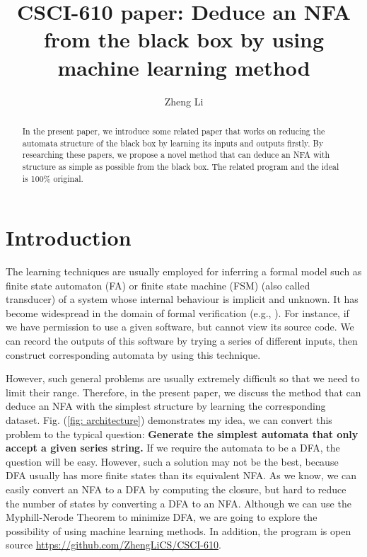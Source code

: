 \documentclass{article}
\begin{document}
\title{CSCI-610 paper: Deduce an NFA from the black box by using machine learning method}

\author{Zheng Li}
\maketitle


\begin{abstract}
    In the present paper, we introduce some related paper that works on reducing the automata structure of the black box by learning its inputs and outputs firstly. 
    By researching these papers,  we propose a novel method that can deduce an NFA with structure as simple as possible from the black box. The related program and the ideal is 100\% original. 
\end{abstract}

\section{Introduction}
The learning techniques are usually employed for inferring a formal model such as finite state automaton (FA) or finite state machine (FSM) (also called transducer) of a system whose internal behaviour is implicit and unknown. It has become widespread in the domain of formal verification (e.g., \cite{peled1999black,groce2002adaptive,cobleigh2003learning,chaki2008verification}).
For instance, if we have permission to use a given software, but cannot view its source code. We can record the outputs of this software by trying a series of different inputs, then construct corresponding automata by using this technique. 


However, such general problems are usually extremely difficult\cite{pacharoen2013active} so that we need to limit their range. Therefore, in the present paper, we discuss the method that can deduce an NFA with the simplest structure by learning the corresponding dataset. Fig. (\ref{fig: architecture}) demonstrates my idea, we can convert this problem to the typical question: \textbf{Generate the simplest automata that only accept a given series string.} If we require the automata to be a DFA, the question will be easy. However, such a solution may not be the best, because DFA usually has more finite states than its equivalent NFA. As we know, we can easily convert an NFA to a DFA by computing the closure, but hard to reduce the number of states by converting a DFA to an NFA. Although we can use the Myphill-Nerode Theorem\cite{nerode1958linear} to minimize DFA, we are going to explore the possibility of using machine learning methods. In addition, the program is open source \href{https://github.com/ZhengLiCS/CSCI-610}{\color{cyan}https://github.com/ZhengLiCS/CSCI-610}.
\end{document}
